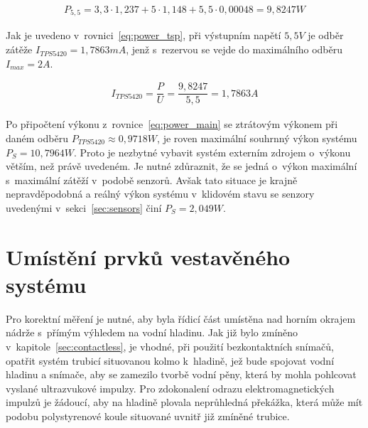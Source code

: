             \begin{samepage}
                \begin{gather}
                    \label{eq:power_main}
                    P_{5,5} = 3,3 \cdot 1,237 + 5 \cdot 1,148 + 5,5 \cdot 0,00048 = 9,8247\unit{W}
                \end{gather}
            \end{samepage}

            Jak je uvedeno v~rovnici~\ref{eq:power_tsp}, při výstupním napětí $5,5\unit{V}$ je odběr zátěže  $I_{TPS5420} = 1,7863\unit{mA}$, jenž s~rezervou se vejde do maximálního odběru $I_{max} = 2\unit{A}$. 

            \begin{samepage}
                \begin{gather}
                    \label{eq:power_tsp}
                    I_{TPS5420} = \dfrac{P}{U} = \dfrac{9,8247}{5,5} = 1,7863\unit{A}
                \end{gather}
            \end{samepage}

            Po připočtení výkonu z~rovnice~\ref{eq:power_main} se ztrátovým výkonem  při daném odběru $P_{TPS5420} \approx 0,9718\unit{W}$, je roven maximální souhrnný výkon systému $P_{S} = 10,7964\unit{W}$. Proto je nezbytné vybavit systém externím zdrojem o~výkonu větším, než právě uvedeném. Je nutné zdůraznit, že se jedná o~výkon maximální s~maximální zátěží v~podobě senzorů. Avšak tato situace je krajně nepravděpodobná a reálný výkon systému v~klidovém stavu se senzory uvedenými v~sekci~\ref{sec:sensors} činí $P_{S} = 2,049\unit{W}$.

    \newpage
    \section{Umístění prvků vestavěného systému}
        Pro korektní měření je nutné, aby byla řídicí část umístěna nad horním okrajem nádrže s~přímým výhledem na vodní hladinu. Jak již bylo zmíněno v~kapitole~\ref{sec:contactless}, je vhodné, při použití bezkontaktních snímačů, opatřit systém trubicí situovanou kolmo k~hladině, jež bude spojovat vodní hladinu a snímače, aby se zamezilo tvorbě vodní pěny, která by mohla pohlcovat vyslané ultrazvukové impulzy. Pro zdokonalení odrazu elektromagnetických impulzů je žádoucí, aby na hladině plovala neprůhledná překážka, která může mít podobu polystyrenové koule situované uvnitř již zmíněné trubice.


